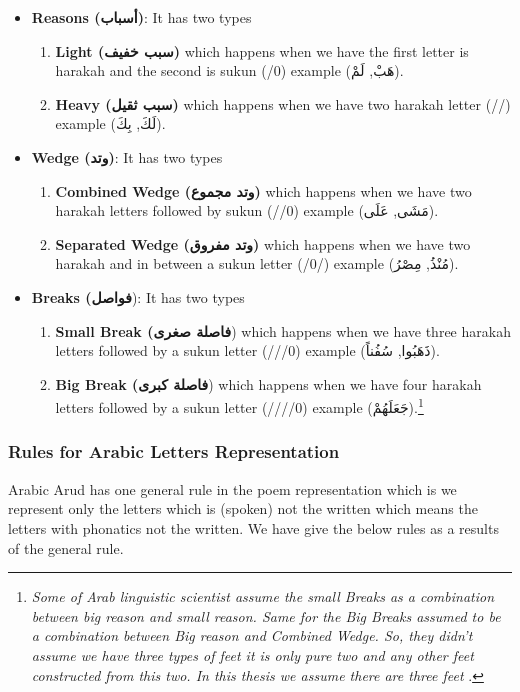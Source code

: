 \begin{itemize}
\item \textbf{Reasons (\textarabic{أسباب})}: It has two types
  \begin{enumerate}
  \item \textbf{Light (\textarabic{سبب خفيف})} which happens when we have the first letter is harakah and the second is sukun (/0) example (\textarabic{هَبْ, لَمْ}).
    \item \textbf{Heavy (\textarabic{سبب ثقيل})} which happens when we have two harakah letter (//) example (\textarabic{لَكَ, بِكَ}).
    \end{enumerate}
    \item \textbf{Wedge (\textarabic{وتد})}: It has two types
  \begin{enumerate}
  \item \textbf{Combined Wedge (\textarabic{وتد مجموع})} which happens when we have two harakah letters followed by sukun (//0) example (\textarabic{مَشَى, عَلَى}).
    \item \textbf{Separated Wedge (\textarabic{وتد مفروق})} which happens when we have two harakah and in between a sukun letter (/0/) example (\textarabic{مُنْذُ, مِصْرُ}).
    \end{enumerate}
    \item \textbf{Breaks (\textarabic{فواصل}}): It has two types
  \begin{enumerate}
  \item \textbf{Small Break (\textarabic{فاصلة صغرى}}) which happens when we have three harakah letters followed by a sukun letter (///0) example (\textarabic{ذَهَبُوا, سُفُناً}).
    \item \textbf{Big Break (\textarabic{فاصلة كبرى}}) which happens when we have four harakah letters followed by a sukun letter  (////0) example (\textarabic{جَعَلَهُمْ}).\footnote{\textit{Some of Arab linguistic scientist assume the small Breaks as a combination between big reason and small reason. Same for the Big Breaks assumed to be a combination between Big reason and Combined Wedge. So, they didn't assume we have three types of feet it is only pure two and any other feet constructed from this two. In this thesis we assume there are three feet }.}
    \end{enumerate}
  \end{itemize}

\newpage
  \subsubsection{Rules for Arabic Letters Representation}
  Arabic Arud has one general rule in the poem representation which is we represent only the letters which is (spoken) not the written which means the letters with phonatics not the written. We have give the below rules as a results of the general rule.

